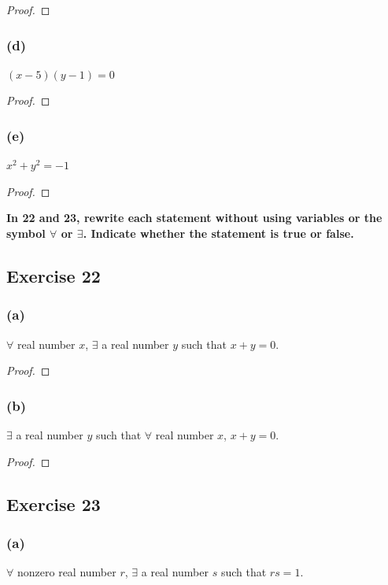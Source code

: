 \documentclass[14pt]{extarticle}
\newcommand{\fa}{\forall}
\newcommand{\te}{\exists}
\begin{document}
\begin{proof}

\end{proof}

\subsubsection{(d)}
$(x - 5)(y - 1) = 0$

\begin{proof}

\end{proof}

\subsubsection{(e)}
$x^2 + y^2 = -1$

\begin{proof}

\end{proof}

{\bf \color{cyan} In 22 and 23, rewrite each statement without using variables or the symbol $\fa$ or $\te$. Indicate whether the statement is true or false.}

\subsection{Exercise 22}
\subsubsection{(a)}
$\fa$ real number $x$, $\te$ a real number $y$ such that $x + y = 0$.

\begin{proof}

\end{proof}

\subsubsection{(b)}
$\te$ a real number $y$ such that $\fa$ real number $x$, $x + y = 0$.

\begin{proof}

\end{proof}

\subsection{Exercise 23}
\subsubsection{(a)}
$\fa$ nonzero real number $r$, $\te$ a real number $s$ such that $rs = 1$.
\end{document}
